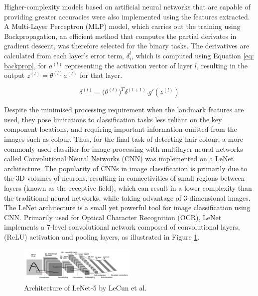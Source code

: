 \documentclass[conference]{IEEEtran}
\begin{document}
Higher-complexity models based on artificial neural networks that are capable of providing greater accuracies were also implemented using the features extracted. A Multi-Layer Perceptron (MLP) model, which carries out the training using Backpropagation, an efficient method that computes the partial derivates in gradient descent, was therefore selected for the binary tasks. The derivatives are calculated from each layer's error term, $\delta_i^l$, which is computed using Equation \ref{eq: backprop}, for $a^{(l)}$ representing the activation vector of layer $l$, resulting in the output $z^{(l)} = \theta^{(l)} a^{(l)}$ for that layer.

\begin{equation}
\delta^{(l)} = \big(\theta^{(l)}\big)^T \delta^{(l+1)}.g'(z^{(l)})
\label{eq: backprop}
\end{equation}

Despite the minimised processing requirement when the landmark features are used, they pose limitations to classification tasks less reliant on the key component locations, and requiring important information omitted from the images such as colour. Thus, for the final task of detecting hair colour, a more commonly-used classifier for image processing with multilayer neural networks called Convolutional Neural Networks (CNN) was implemented on a LeNet architecture. The popularity of CNNs in image classification is primarily due to the 3D volumes of neurons, resulting in connectivities of small regions between layers (known as the receptive field), which can result in a lower complexity than the traditional neural networks, while taking advantage of 3-dimensional images. 
The LeNet architecture is a small yet powerful tool for image classification using CNN. Primarily used for Optical Character Recognition (OCR), LeNet implements a 7-level convolutional network composed of convolutional layers, (ReLU) activation and pooling layers, as illustrated in Figure \ref{fig: LeNet}.

\begin{figure} [h] %
  \centering
    \includegraphics[width=0.5\textwidth]{graphs/LeNet} 
    \caption{Architecture of LeNet-5 by LeCun et al. \cite{LeCun}}
    \label{fig: LeNet}
\end{figure}
\end{document}
